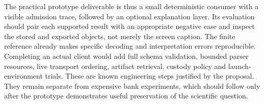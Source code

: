 The practical prototype deliverable is thus a small deterministic consumer
with a visible admission trace, followed by an optional explanation layer.
Its evaluation should pair each supported result with an appropriate
negative case and inspect the stored and exported objects, not merely the
screen caption. The finite reference already makes specific decoding and
interpretation errors reproducible. Completing an actual client would add
full schema validation, bounded parser resources, live transport ordering,
artifact retrieval, custody policy and launch-environment trials. These are
known engineering steps justified by the proposal. They remain separate
from expensive bank experiments, which should follow only after the
prototype demonstrates useful preservation of the scientific question.
\label{exec17:i2-admission-end}

